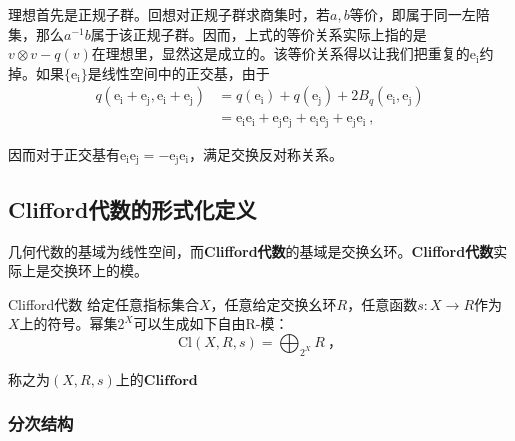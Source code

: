 理想首先是正规子群。回想对正规子群求商集时，若$a,b$等价，即属于同一左陪集，那么$a^{-1}b$属于该正规子群。因而，上式的等价关系实际上指的是
$v \otimes v-q(v)$在理想里，显然这是成立的。该等价关系得以让我们把重复的$\mathrm {e_i}$约掉。如果$\{\mathrm{e_i}\}$是线性空间中的正交基，由于
\begin{equation}
\begin{aligned}
q(\mathrm{e_i+e_j,e_i+e_j})&=q(\mathrm{e_i})+q(\mathrm{e_j})+2 B_q(\mathrm{e_i,e_j})\\
&=\mathrm{e_ie_i+e_je_j+e_ie_j+e_je_i}~,
\end{aligned}
\end{equation}

因而对于正交基有$\mathrm{e_ie_j=-e_je_i}$，满足交换反对称关系。

\subsection{Clifford代数的形式化定义}
几何代数的基域为线性空间，而\textbf{Clifford代数}的基域是交换幺环。\textbf{Clifford代数}实际上是交换环上的模。
\begin{definition}{Clifford代数}
给定任意指标集合$X$，任意给定交换幺环$R$，任意函数$s:X\rightarrow {R}$作为$X$上的符号。幂集$2^X$可以生成如下自由R-模：
\begin{equation}
\mathrm{Cl}(X, R, s)=\bigoplus_{2^X} R ~，
\end{equation}
\end{definition}
称之为$(X,R,s)$上的$\textbf{Clifford}$
\subsubsection{分次结构}

